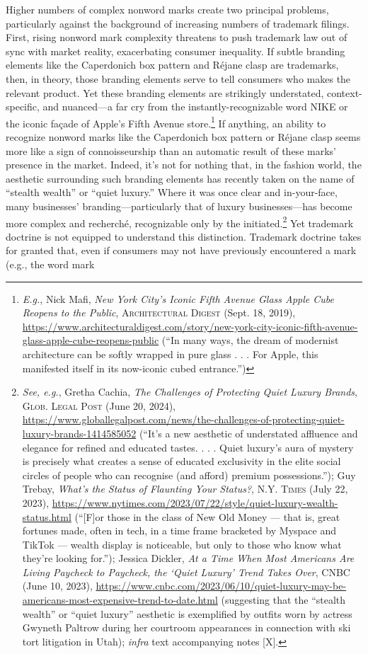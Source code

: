 \documentclass[letterpaper, 11pt, oneside]{article}
\begin{document}
Higher numbers of complex nonword marks create two principal problems, particularly against the background of increasing numbers of trademark filings. First, rising nonword mark complexity threatens to push trademark law out of sync with market reality, exacerbating consumer inequality. If subtle branding elements like the Caperdonich box pattern and Réjane clasp are trademarks, then, in theory, those branding elements serve to tell consumers who makes the relevant product. Yet these branding elements are strikingly understated, context-specific, and nuanced—a far cry from the instantly-recognizable word NIKE or the iconic façade of Apple's Fifth Avenue store.\footnote{\textit{E.g.}, Nick Mafi, \textit{New York City’s Iconic Fifth Avenue Glass Apple Cube Reopens to the Public}, \textsc{Architectural Digest} (Sept. 18, 2019), \url{https://www.architecturaldigest.com/story/new-york-city-iconic-fifth-avenue-glass-apple-cube-reopens-public} (``In many ways, the dream of modernist architecture can be softly wrapped in pure glass . . . For Apple, this manifested itself in its now-iconic cubed entrance.'')} If anything, an ability to recognize nonword marks like the Caperdonich box pattern or Réjane clasp seems more like a sign of connoisseurship than an automatic result of these marks' presence in the market. Indeed, it's not for nothing that, in the fashion world, the aesthetic surrounding such branding elements has recently taken on the name of ``stealth wealth'' or ``quiet luxury.'' Where it was once clear and in-your-face, many businesses' branding—particularly that of luxury businesses—has become more complex and recherché, recognizable only by the initiated.\footnote{\textit{See, e.g.}, Gretha Cachia, \textit{The Challenges of Protecting Quiet Luxury Brands}, \textsc{Glob. Legal Post} (June 20, 2024), \url{https://www.globallegalpost.com/news/the-challenges-of-protecting-quiet-luxury-brands-1414585052} (``It’s a new aesthetic of understated affluence and elegance for refined and educated tastes. . . . Quiet luxury’s aura of mystery is precisely what creates a sense of educated exclusivity in the elite social circles of people who can recognise (and afford) premium possessions.''); Guy Trebay, \textit{What's the Status of Flaunting Your Status?}, \textsc{N.Y. Times} (July 22, 2023), \url{https://www.nytimes.com/2023/07/22/style/quiet-luxury-wealth-status.html} (``[F]or those in the class of New Old Money — that is, great fortunes made, often in tech, in a time frame bracketed by Myspace and TikTok — wealth display is noticeable, but only to those who know what they’re looking for.''); Jessica Dickler, \textit{At a Time When Most Americans Are Living Paycheck to Paycheck, the ‘Quiet Luxury’ Trend Takes Over}, CNBC (June 10, 2023), \url{https://www.cnbc.com/2023/06/10/quiet-luxury-may-be-americans-most-expensive-trend-to-date.html} (suggesting that the ``stealth wealth'' or ``quiet luxury'' aesthetic is exemplified by outfits worn by actress Gwyneth Paltrow during her courtroom appearances in connection with ski tort litigation in Utah); \textit{infra} text accompanying notes [X].} Yet trademark doctrine is not equipped to understand this distinction. Trademark doctrine takes for granted that, even if consumers may not have previously encountered a mark (e.g., the word mark 
\end{document}
